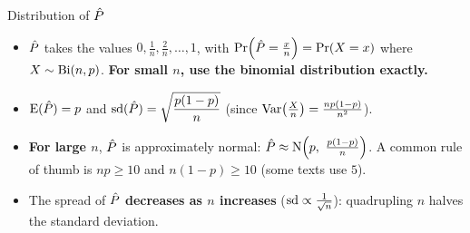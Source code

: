 \begin{keyres}{Distribution of $\hat{P}$}
\begin{itemize}
  \item $\hat{P}$ takes the values $0,\frac1n,\frac2n,\dots,1$, with $\Pr\!\left(\hat{P}=\frac xn\right)=\Pr(X=x)$ where $X\sim\mathrm{Bi}(n,p)$. \textbf{For small $n$, use the binomial distribution exactly.}
  \item $\mathrm{E}(\hat{P})=p$ \quad and \quad $\mathrm{sd}(\hat{P})=\sqrt{\dfrac{p(1-p)}{n}}$ (since $\mathrm{Var}\!\left(\frac Xn\right)=\frac{np(1-p)}{n^2}$).
  \item \textbf{For large $n$}, $\hat{P}$ is approximately normal: $\Phat\approx\Nd\!\left(p,\ \frac{p(1-p)}{n}\right)$. A common rule of thumb is $np\ge10$ and $n(1-p)\ge10$ (some texts use $5$).
  \item The spread of $\hat{P}$ \textbf{decreases as $n$ increases} ($\mathrm{sd}\propto\frac{1}{\sqrt n}$): quadrupling $n$ halves the standard deviation.
\end{itemize}
\end{keyres}


